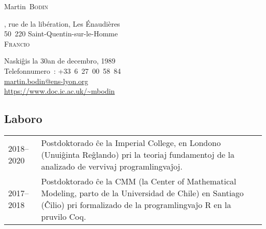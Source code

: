 \documentclass[12pt,a4paper]{article}
\makeatletter
\newcommand{\en}[1]{\foreignlanguage{english}{{#1}}}
\newcommand{\es}[1]{\foreignlanguage{spanish}{{#1}}}
\newcommand{\en}[1]{\foreignlanguage{english}{{#1}}}
\newcommand{\es}[1]{\foreignlanguage{spanish}{{#1}}}
\newenvironment{datecvsection}[1]%
               {\subsection*{#1}%
                 \noindent \begin{tabular}{@{}p{\annee}p{\texte}@{}}}
               {\end{tabular}}
\newcommand\familyName{\textsc}
\newcommand\placeName{}
\makeatother
\begin{document}
\pagestyle{empty}


\newlength{\annee}
\settowidth{\annee}{9999--9999}


\newlength{\texte}
\setlength{\texte}{\textwidth} \addtolength{\texte}{-\annee} 
	\addtolength{\texte}{-2\tabcolsep}

\begin{center} \Huge Martin~\familyName{Bodin} \end{center}

\parbox[c]{.5\textwidth}
{
  , rue de la libération,
  Les Énaudières \\
  50~220 Saint-Quentin-sur-le-Homme \\
  \textsc{Francio}
}
\parbox[c]{.55\textwidth}
{
\begin{flushright}
  Naskiĝis la 30an de decembro, 1989 \\
  \noindent Telefonnumero~: \mbox{+33 6 27 00 58 84} \\
  \url{martin.bodin@ens-lyon.org} \\
  \url{https://www.doc.ic.ac.uk/~mbodin}
\end{flushright}
}


\begin{datecvsection}{Laboro}

    2018–2020 & Postdoktorado ĉe la \en{\placeName{Imperial College}}, en \placeName{Londono} (\placeName{Unuiĝinta Reĝlando}) pri la teoriaj fundamentoj de la analizado de vervivaj programlingvaĵoj. \\

    2017–2018 & Postdoktorado ĉe la \placeName{CMM} (la \en{\placeName{Center of Mathematical Modeling}}, parto de la \es{\placeName{Universidad de Chile}}) en \placeName{Santiago} (\placeName{Ĉilio}) pri formalizado de la programlingvaĵo R en la pruvilo Coq. \\

\end{datecvsection}
\end{document}
